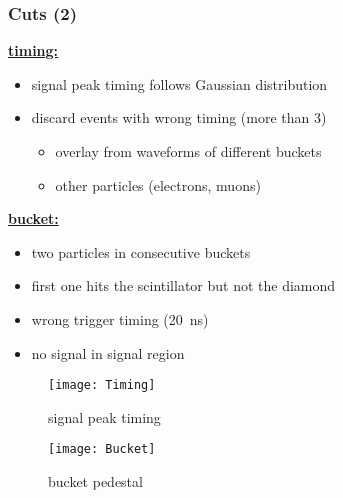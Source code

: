 \begin{frame}
	\frametitle{Cuts (2)}
	\begin{minipage}{8cm}
		\textbf{\underline{timing:}}
		\begin{itemize}
			\setlength{\itemsep}{\fill}
			\item signal peak timing follows Gaussian distribution
			\item discard events with wrong timing (more than \SI{3}{\upsigma})
			\begin{itemize}
				\item overlay from waveforms of different buckets
				\item other particles (electrons, muons)
			\end{itemize}
		\end{itemize}
		\vspace*{1cm}
		\textbf{\underline{bucket:}}
		\begin{itemize}
			\setlength{\itemsep}{\fill}
			\item two particles in consecutive buckets 
			\item first one hits the scintillator but not the diamond
			\item wrong trigger timing (\SI[retain-explicit-plus]{20}{ns})
			\item no signal in signal region
		\end{itemize}
	\end{minipage}
	\begin{minipage}{4cm}
		\vspace*{-2pt}
		\begin{figure}
			\centering
			\texttt{[image: Timing]}
			\vspace*{-8pt}
			\caption{signal peak timing}
		\end{figure}
		\vspace*{-25pt}
		\begin{figure}
			\centering
			\texttt{[image: Bucket]}
			\vspace*{-8pt}
			\caption{bucket pedestal}
		\end{figure}
	\end{minipage}
\end{frame}
